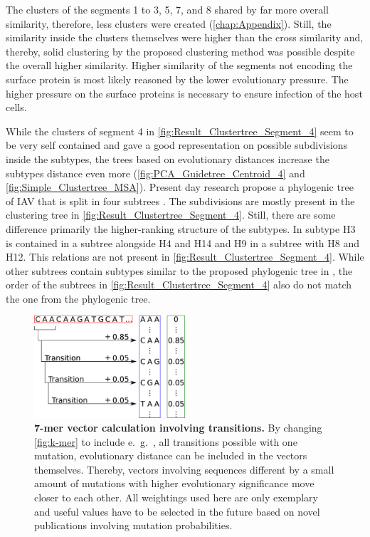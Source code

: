 \vspace{1em}

The clusters of the segments 1 to 3, 5, 7, and 8 shared by far more overall similarity, therefore, less clusters were created (\autoref{chap:Appendix}). Still, the similarity inside the clusters themselves were higher than the cross similarity and, thereby, solid clustering by the proposed clustering method was possible despite the overall higher similarity. Higher similarity of the segments not encoding the surface protein is most likely reasoned by the lower evolutionary pressure. The higher pressure on the surface proteins is necessary to ensure infection of the host cells. 

\vspace{1em}

While the clusters of segment 4 in \autoref{fig:Result_Clustertree_Segment_4} seem to be very self contained and gave a good representation on possible subdivisions inside the subtypes, the trees based on evolutionary distances increase the subtypes distance even more (\autoref{fig:PCA_Guidetree_Centroid_4} and \autoref{fig:Simple_Clustertree_MSA}). Present day research propose a phylogenic tree of \gls{IAV} that is split in four subtrees \autocite{wei_next-generation_2020}. The subdivisions are mostly present in the clustering tree in \autoref{fig:Result_Clustertree_Segment_4}. Still, there are some difference primarily the higher-ranking structure of the subtypes. In \textcite{wei_next-generation_2020} subtype H3 is contained in a subtree alongside H4 and H14 and H9 in a subtree with H8 and H12. This relations are not present in \autoref{fig:Result_Clustertree_Segment_4}. While other subtrees contain subtypes similar to the proposed phylogenic tree in \textcite{wei_next-generation_2020}, the order of the subtrees in \autoref{fig:Result_Clustertree_Segment_4} also do not match the one from the phylogenic tree.

\begin{figure}[!hbt]
    \centering
    \includegraphics[width=0.5\textwidth]{Graphics/Transition.pdf}
    \caption[7-mer vector calculation involving transitions]{\textbf{7-mer vector calculation involving transitions.} By changing \autoref{fig:k-mer} to include e.~g.~, all transitions possible with one mutation, evolutionary distance can be included in the vectors themselves. Thereby, vectors involving sequences different by a small amount of mutations with higher evolutionary significance move closer to each other. All weightings used here are only exemplary and useful values have to be selected in the future based on novel publications  involving mutation probabilities.}
    \label{fig:trans}
\end{figure}

